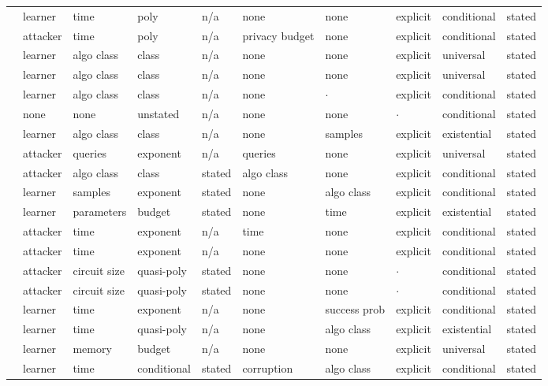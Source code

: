 \begin{landscape}
\begin{longtable}{rlllllllll}
\cite{HN23} & learner & time & poly & n/a & none & none & explicit & conditional & stated \\
\cite{GKY11} & attacker & time & poly & n/a & privacy budget & none & explicit & conditional & stated \\
\cite{CGGV25} & learner & algo class & class & n/a & none & none & explicit & universal & stated \\
\cite{SW22} & learner & algo class & class & n/a & none & none & explicit & universal & stated \\
\cite{Wei25} & learner & algo class & class & n/a & none & $\cdot$ & explicit & conditional & stated \\
\cite{CQYKMHBW24} & none & none & unstated & n/a & none & none & $\cdot$ & conditional & stated \\
\cite{ABM22} & learner & algo class & class & n/a & none & samples & explicit & existential & stated \\
\cite{BM09} & attacker & queries & exponent & n/a & queries & none & explicit & universal & stated \\
\cite{WSPX24} & attacker & algo class & class & stated & algo class & none & explicit & conditional & stated \\
\cite{DKLM26} & learner & samples & exponent & stated & none & algo class & explicit & conditional & stated \\
\cite{GJMMW22} & learner & parameters & budget & stated & none & time & explicit & existential & stated \\
\cite{BGHKP24} & attacker & time & exponent & n/a & time & none & explicit & conditional & stated \\
\cite{LLW19} & attacker & time & exponent & n/a & none & none & explicit & conditional & stated \\
\cite{BW08} & attacker & circuit size & quasi-poly & stated & none & none & $\cdot$ & conditional & stated \\
\cite{GHJS25} & attacker & circuit size & quasi-poly & stated & none & none & $\cdot$ & conditional & stated \\
\cite{KPR25} & learner & time & exponent & n/a & none & success prob & explicit & conditional & stated \\
\cite{BHJK25} & learner & time & quasi-poly & n/a & none & algo class & explicit & existential & stated \\
\cite{Raz16} & learner & memory & budget & n/a & none & none & explicit & universal & stated \\
\cite{BB20} & learner & time & conditional & stated & corruption & algo class & explicit & conditional & stated \\

\end{longtable}
\end{landscape}
